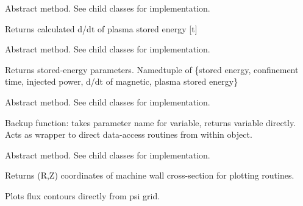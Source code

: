 \documentclass[letterpaper,10pt,english]{sphinxmanual}
\begin{document}
\begin{fulllineitems}

\begin{fulllineitems}
\label{eqtools:eqtools.core.Equilibrium.getWpdot}
Abstract method.  See child classes for implementation.

Returns calculated d/dt of plasma stored energy {[}t{]}

\end{fulllineitems}


\begin{fulllineitems}
\label{eqtools:eqtools.core.Equilibrium.getEnergy}
Abstract method.  See child classes for implementation.

Returns stored-energy parameters.
Namedtuple of \{stored energy, confinement time, injected power, d/dt of magnetic, plasma stored energy\}

\end{fulllineitems}


\begin{fulllineitems}
\label{eqtools:eqtools.core.Equilibrium.getParam}
Abstract method.  See child classes for implementation.

Backup function: takes parameter name for variable, returns variable directly.
Acts as wrapper to direct data-access routines from within object.

\end{fulllineitems}


\begin{fulllineitems}
\label{eqtools:eqtools.core.Equilibrium.getMachineCrossSection}
Abstract method.  See child classes for implementation.

Returns (R,Z) coordinates of machine wall cross-section for plotting routines.

\end{fulllineitems}


\begin{fulllineitems}
\label{eqtools:eqtools.core.Equilibrium.plotFlux}
Plots flux contours directly from psi grid.

\end{fulllineitems}


\end{fulllineitems}
\end{document}
